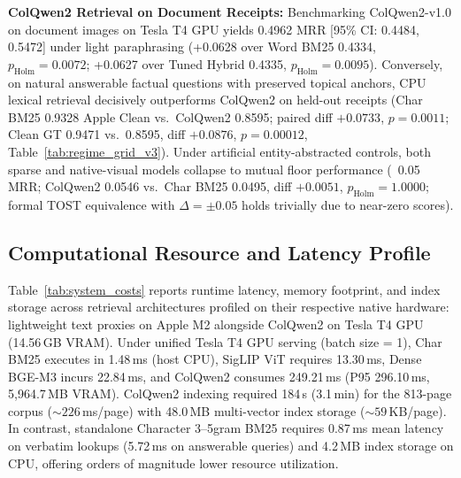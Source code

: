 \textbf{ColQwen2 Retrieval on Document Receipts:} Benchmarking ColQwen2-v1.0 \cite{faysse2024colqwen2} on document images on Tesla T4 GPU yields 0.4962 MRR [95\% CI: 0.4484, 0.5472] under light paraphrasing (+0.0628 over Word BM25 0.4334, $p_{\text{Holm}} = 0.0072$; +0.0627 over Tuned Hybrid 0.4335, $p_{\text{Holm}} = 0.0095$). Conversely, on natural answerable factual questions with preserved topical anchors, CPU lexical retrieval decisively outperforms ColQwen2 on held-out receipts (Char BM25 0.9328 Apple Clean vs.\ ColQwen2 0.8595; paired diff $+0.0733$, $p = 0.0011$; Clean GT 0.9471 vs.\ 0.8595, diff $+0.0876$, $p=0.00012$, Table~\ref{tab:regime_grid_v3}). Under artificial entity-abstracted controls, both sparse and native-visual models collapse to mutual floor performance (~0.05 MRR; ColQwen2 0.0546 vs.\ Char BM25 0.0495, diff $+0.0051$, $p_{\text{Holm}}=1.0000$; formal TOST equivalence with $\Delta=\pm 0.05$ holds trivially due to near-zero scores).

\subsection{Computational Resource and Latency Profile}
\label{sec:system_costs_eval}

Table~\ref{tab:system_costs} reports runtime latency, memory footprint, and index storage across retrieval architectures profiled on their respective native hardware: lightweight text proxies on Apple M2 alongside ColQwen2 on Tesla T4 GPU (14.56\,GB VRAM). Under unified Tesla T4 GPU serving (batch size = 1), Char BM25 executes in 1.48\,ms (host CPU), SigLIP ViT requires 13.30\,ms, Dense BGE-M3 incurs 22.84\,ms, and ColQwen2 consumes 249.21\,ms (P95 296.10\,ms, 5,964.7\,MB VRAM). ColQwen2 indexing required 184\,s (3.1\,min) for the 813-page corpus ($\sim 226$\,ms/page) with 48.0\,MB multi-vector index storage ($\sim 59$\,KB/page). In contrast, standalone Character 3--5gram BM25 requires 0.87\,ms mean latency on verbatim lookups (5.72\,ms on answerable queries) and 4.2\,MB index storage on CPU, offering orders of magnitude lower resource utilization.

